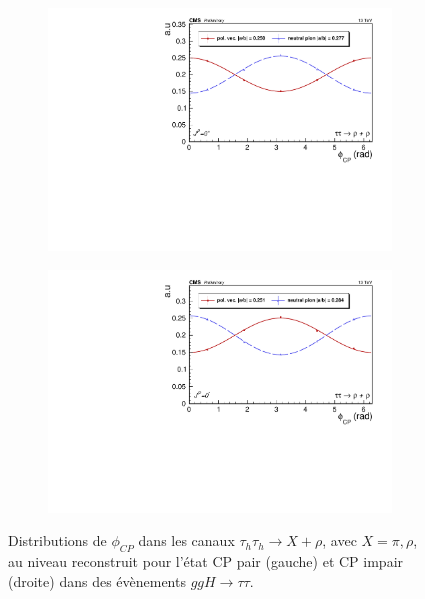 \begin{figure}[!ht]
  \begin{subfigure}[b]{0.5\linewidth}
    \centering
    \includegraphics[width=\linewidth]{Chapitre6/Images/RHORHO/RHORHO_even_reco.pdf} 
    \caption*{} 
    \vspace{0.5ex}
  \end{subfigure}%
  \begin{subfigure}[b]{0.5\linewidth}
    \centering
    \includegraphics[width=\linewidth]{Chapitre6/Images/RHORHO/RHORHO_odd_reco.pdf} 
    \caption*{} 
    \vspace{0.5ex}
  \end{subfigure} 
  \caption{Distributions de $\phi_{CP}$ dans les canaux $\tau_h\tau_h\rightarrow X+\rho$, avec $X=\pi,\rho$, au niveau reconstruit pour l'état CP pair (gauche) et CP impair (droite) dans des évènements $ggH\to\tau\tau$.}
  \label{CPrecoXPI}
\end{figure}

